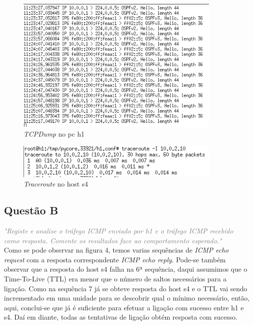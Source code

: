 \documentclass{llncs}
\newcommand{\questionE}[1]{\textcolor{gray}{\textit{"#1"}}}
\begin{document}
\begin{figure}[H]
\begin{center}
\includegraphics[width=10cm]{1aTracedump.PNG}
\end{center}
\caption{\textit{TCPDump} no pc h1}
\end{figure}

\begin{figure}[H]
\begin{center}
\includegraphics[width=10cm]{1aTraceroute.PNG}
\end{center}
\caption{\textit{Traceroute} no host s4}
\end{figure}

\subsection{Questão B}
\hspace{3mm}
\questionE{Registe e analise o tráfego ICMP enviado por h1 e o tráfego ICMP recebido como resposta. Comente os resultados face ao comportamento esperado.}\\

Como se pode observar na figura 4, temos varias sequências de \textit{ICMP echo request} com a resposta correspondente \textit{ICMP echo reply}. Pode-se também observar que a resposta do host s4 falha na 6ª sequência, daqui assumimos que o Time-To-Live (TTL) era menor que o número de saltos necessários para a ligação. Como na sequência 7 já se obteve resposta do host s4 e o TTL vai sendo incrementado em uma unidade para se descobrir qual o mínimo necessário, então, aqui, conclui-se que já é suficiente para efetuar a ligação com sucesso entre h1 e s4. Daí em diante, todas as tentativas de ligação obtém resposta com sucesso.
\end{document}
